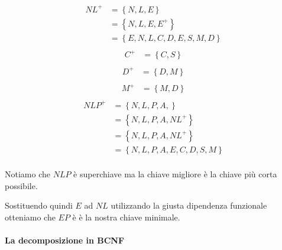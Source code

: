 \begin{exmp}
    \begin{equation}
        \begin{split}
            NL^+&= \left\{ N,L,E \right\} \\
            &= \left\{N,L,E, E^+ \right\}  \\
            &= \left\{ E,N,L,C,D,E,S,M,D\right\}  \\
        \end{split}
    \end{equation}
    \begin{equation}
        \begin{split}
            C^+&= \left\{C, S \right\} \\
        \end{split}
    \end{equation}
    \begin{equation}
        \begin{split}
            D^+&= \left\{D,  M\right\} \\
        \end{split}
    \end{equation}
    \begin{equation}
        \begin{split}
            M^+&= \left\{M, D \right\} \\
        \end{split}
    \end{equation}
    \begin{equation}
        \begin{split}
            NLP^+&= \left\{N,L,P,A, \right\} \\
            &= \left\{N,L,P,A,NL^+ \right\} \\
            &= \left\{N,L,P,A,NL^+ \right\} \\
            &= \left\{N,L,P,A,E,C,D,S,M \right\} \\
        \end{split}
    \end{equation}

    Notiamo che $NLP$ è superchiave ma la chiave migliore è la chiave più corta possibile.

    Sostituendo quindi $E$ ad $NL$ utilizzando la giusta dipendenza funzionale otteniamo che $EP$ è è la nostra chiave minimale.

    \paragraph{La decomposizione in BCNF}


\end{exmp}
